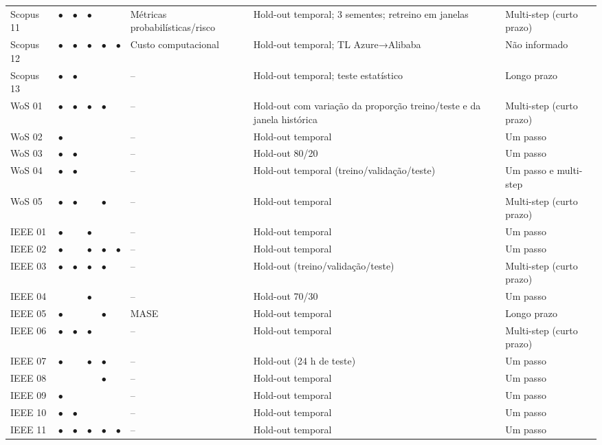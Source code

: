 {\begin{longtable}{p{1.3cm}ccccc p{2.0cm}p{3.2cm}p{2.0cm}}
Scopus 11 & $\bullet$ & $\bullet$ & $\bullet$ &  &  & Métricas probabilísticas/risco & Hold-out temporal; 3 sementes; retreino em janelas & Multi-step (curto prazo) \\
Scopus 12 & $\bullet$ & $\bullet$ & $\bullet$ & $\bullet$ & $\bullet$ & Custo computacional & Hold-out temporal; TL Azure→Alibaba & Não informado \\
Scopus 13 & $\bullet$ & $\bullet$ &  &  &  & -- & Hold-out temporal; teste estatístico & Longo prazo \\
WoS 01 & $\bullet$ & $\bullet$ & $\bullet$ & $\bullet$ &  & -- & Hold-out com variação da proporção treino/teste e da janela histórica & Multi-step (curto prazo) \\
WoS 02 & $\bullet$ &  &  &  &  & -- & Hold-out temporal & Um passo \\
WoS 03 & $\bullet$ & $\bullet$ &  &  &  & -- & Hold-out 80/20 & Um passo \\
WoS 04 & $\bullet$ & $\bullet$ &  &  &  & -- & Hold-out temporal (treino/validação/teste) & Um passo e multi-step \\
WoS 05 & $\bullet$ & $\bullet$ &  & $\bullet$ &  & -- & Hold-out temporal & Multi-step (curto prazo) \\
IEEE 01 & $\bullet$ &  & $\bullet$ &  &  & -- & Hold-out temporal & Um passo \\
IEEE 02 & $\bullet$ &  & $\bullet$ & $\bullet$ & $\bullet$ & -- & Hold-out temporal & Um passo \\
IEEE 03 & $\bullet$ & $\bullet$ & $\bullet$ & $\bullet$ &  & -- & Hold-out (treino/validação/teste) & Multi-step (curto prazo) \\
IEEE 04 &  &  & $\bullet$ &  &  & -- & Hold-out 70/30 & Um passo \\
IEEE 05 & $\bullet$ &  &  & $\bullet$ &  & MASE & Hold-out temporal & Longo prazo \\
IEEE 06 & $\bullet$ & $\bullet$ & $\bullet$ &  &  & -- & Hold-out temporal & Multi-step (curto prazo) \\
IEEE 07 & $\bullet$ &  & $\bullet$ & $\bullet$ &  & -- & Hold-out (24 h de teste) & Um passo \\
IEEE 08 &  &  &  & $\bullet$ &  & -- & Hold-out temporal & Um passo \\
IEEE 09 & $\bullet$ &  &  &  &  & -- & Hold-out temporal & Um passo \\
IEEE 10 & $\bullet$ & $\bullet$ &  &  &  & -- & Hold-out temporal & Um passo \\
IEEE 11 & $\bullet$ & $\bullet$ & $\bullet$ & $\bullet$ & $\bullet$ & -- & Hold-out temporal & Um passo \\

\end{longtable}}
